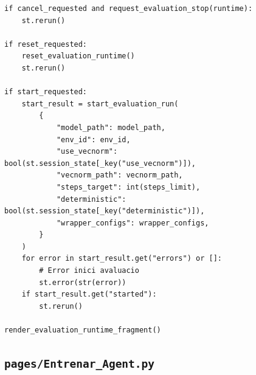 \documentclass[10pt,a4paper]{article}
\begin{document}
\begin{lstlisting}[style=studioPython,caption={pages/Avaluar\_Agent.py},label={lst:pages-avaluar-agent-py}]
if cancel_requested and request_evaluation_stop(runtime):
    st.rerun()

if reset_requested:
    reset_evaluation_runtime()
    st.rerun()

if start_requested:
    start_result = start_evaluation_run(
        {
            "model_path": model_path,
            "env_id": env_id,
            "use_vecnorm": bool(st.session_state[_key("use_vecnorm")]),
            "vecnorm_path": vecnorm_path,
            "steps_target": int(steps_limit),
            "deterministic": bool(st.session_state[_key("deterministic")]),
            "wrapper_configs": wrapper_configs,
        }
    )
    for error in start_result.get("errors") or []:
        # Error inici avaluacio
        st.error(str(error))
    if start_result.get("started"):
        st.rerun()

render_evaluation_runtime_fragment()
\end{lstlisting}


\subsection{\texorpdfstring{\texttt{pages/Entrenar\_Agent.py}}{pages/Entrenar\_Agent.py}}
\end{document}
